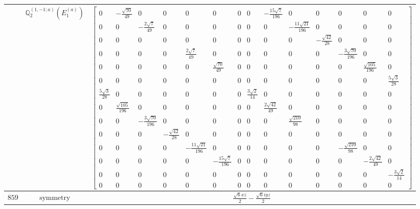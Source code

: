 \documentclass[fleqn,8pt,landscape]{jsarticle}
\begin{document}
\begin{longtable}{ccc}
$  $ & $ \mathbb{Q}_{2}^{(1,-1;a)}(E_{1}^{(a)}) $ & $ \begin{bmatrix} 0 & - \frac{\sqrt{70}}{49} & 0 & 0 & 0 & 0 & 0 & 0 & - \frac{15 \sqrt{7}}{196} & 0 & 0 & 0 & 0 & 0 \\ 0 & 0 & - \frac{2 \sqrt{7}}{49} & 0 & 0 & 0 & 0 & 0 & 0 & - \frac{11 \sqrt{21}}{196} & 0 & 0 & 0 & 0 \\ 0 & 0 & 0 & 0 & 0 & 0 & 0 & 0 & 0 & 0 & - \frac{\sqrt{42}}{28} & 0 & 0 & 0 \\ 0 & 0 & 0 & 0 & \frac{2 \sqrt{7}}{49} & 0 & 0 & 0 & 0 & 0 & 0 & - \frac{3 \sqrt{70}}{196} & 0 & 0 \\ 0 & 0 & 0 & 0 & 0 & \frac{\sqrt{70}}{49} & 0 & 0 & 0 & 0 & 0 & 0 & \frac{\sqrt{105}}{196} & 0 \\ 0 & 0 & 0 & 0 & 0 & 0 & 0 & 0 & 0 & 0 & 0 & 0 & 0 & \frac{5 \sqrt{3}}{28} \\ \frac{5 \sqrt{3}}{28} & 0 & 0 & 0 & 0 & 0 & 0 & \frac{3 \sqrt{2}}{14} & 0 & 0 & 0 & 0 & 0 & 0 \\ 0 & \frac{\sqrt{105}}{196} & 0 & 0 & 0 & 0 & 0 & 0 & \frac{2 \sqrt{42}}{49} & 0 & 0 & 0 & 0 & 0 \\ 0 & 0 & - \frac{3 \sqrt{70}}{196} & 0 & 0 & 0 & 0 & 0 & 0 & \frac{\sqrt{210}}{98} & 0 & 0 & 0 & 0 \\ 0 & 0 & 0 & - \frac{\sqrt{42}}{28} & 0 & 0 & 0 & 0 & 0 & 0 & 0 & 0 & 0 & 0 \\ 0 & 0 & 0 & 0 & - \frac{11 \sqrt{21}}{196} & 0 & 0 & 0 & 0 & 0 & 0 & - \frac{\sqrt{210}}{98} & 0 & 0 \\ 0 & 0 & 0 & 0 & 0 & - \frac{15 \sqrt{7}}{196} & 0 & 0 & 0 & 0 & 0 & 0 & - \frac{2 \sqrt{42}}{49} & 0 \\ 0 & 0 & 0 & 0 & 0 & 0 & 0 & 0 & 0 & 0 & 0 & 0 & 0 & - \frac{3 \sqrt{2}}{14} \\ 0 & 0 & 0 & 0 & 0 & 0 & 0 & 0 & 0 & 0 & 0 & 0 & 0 & 0 \end{bmatrix} $ \\ \hline
$ 859 $ & $ \text{symmetry} $ & $ \frac{\sqrt{6} x z}{2} - \frac{\sqrt{6} i y z}{2} $ \\

\end{longtable}
\end{document}
